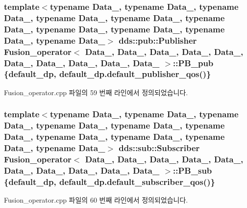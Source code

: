 \subsubsection[{\texorpdfstring{P\+B\+\_\+pub}{PB_pub}}]{\setlength{\rightskip}{0pt plus 5cm}template$<$typename Data\+\_, typename Data\+\_, typename Data\+\_, typename Data\+\_, typename Data\+\_, typename Data\+\_, typename Data\+\_, typename Data\+\_, typename Data\+\_, typename Data\+\_$>$ dds\+::pub\+::\+Publisher {\bf Fusion\+\_\+operator}$<$ Data\+\_, Data\+\_, Data\+\_, Data\+\_, Data\+\_, Data\+\_, Data\+\_, Data\+\_, Data\+\_, Data\+\_ $>$\+::P\+B\+\_\+pub \{{\bf default\+\_\+dp}, default\+\_\+dp.\+default\+\_\+publisher\+\_\+qos()\}}\hypertarget{classFusion__operator_a121024c841142a5b50be10b19e94653e}{}\label{classFusion__operator_a121024c841142a5b50be10b19e94653e}


Fusion\+\_\+operator.\+cpp 파일의 59 번째 라인에서 정의되었습니다.

\subsubsection[{\texorpdfstring{P\+B\+\_\+sub}{PB_sub}}]{\setlength{\rightskip}{0pt plus 5cm}template$<$typename Data\+\_, typename Data\+\_, typename Data\+\_, typename Data\+\_, typename Data\+\_, typename Data\+\_, typename Data\+\_, typename Data\+\_, typename Data\+\_, typename Data\+\_$>$ dds\+::sub\+::\+Subscriber {\bf Fusion\+\_\+operator}$<$ Data\+\_, Data\+\_, Data\+\_, Data\+\_, Data\+\_, Data\+\_, Data\+\_, Data\+\_, Data\+\_, Data\+\_ $>$\+::P\+B\+\_\+sub \{{\bf default\+\_\+dp}, default\+\_\+dp.\+default\+\_\+subscriber\+\_\+qos()\}}\hypertarget{classFusion__operator_aa22d9bbeb385dc5b1e31d85d65d63f28}{}\label{classFusion__operator_aa22d9bbeb385dc5b1e31d85d65d63f28}


Fusion\+\_\+operator.\+cpp 파일의 60 번째 라인에서 정의되었습니다.

